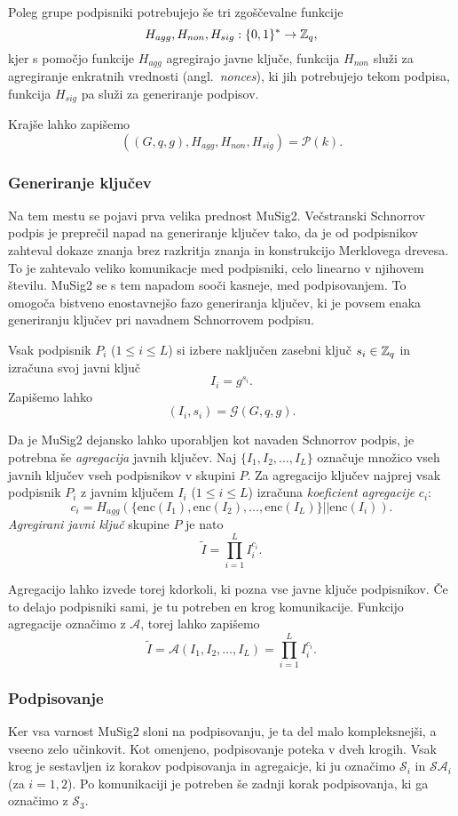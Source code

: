Poleg grupe podpisniki potrebujejo še tri zgoščevalne funkcije
$$
H_{agg}, H_{non}, H_{sig}:\{0, 1\}^* \rightarrow \mathbb Z_q,
$$
kjer s pomočjo funkcije $H_{agg}$ agregirajo javne ključe, funkcija $H_{non}$ služi za agregiranje
enkratnih vrednosti (angl.\ \textit{nonces}), ki jih potrebujejo tekom podpisa, funkcija $H_{sig}$
pa služi za generiranje podpisov.

Krajše lahko zapišemo
$$
((G, q, g), H_{agg}, H_{non}, H_{sig}) = \mathcal{P}(k).
$$

\subsubsection{Generiranje ključev}
Na tem mestu se pojavi prva velika prednost MuSig2. Večstranski Schnorrov podpis je preprečil napad
na generiranje ključev tako, da je od podpisnikov zahteval dokaze znanja brez razkritja znanja in
konstrukcijo Merklovega drevesa. To je zahtevalo veliko komunikacje med podpisniki, celo linearno
v njihovem številu. MuSig2 se s tem napadom sooči kasneje, med podpisovanjem. To omogoča bistveno
enostavnejšo fazo generiranja ključev, ki je povsem enaka generiranju ključev pri navadnem
Schnorrovem podpisu.

Vsak podpisnik $P_i$ ($1 \le i \le L$) si izbere naključen zasebni ključ $s_i \in \mathbb Z_q$ in izračuna
svoj javni ključ
$$
I_i = g^{s_i}.
$$
Zapišemo lahko
$$
(I_i, s_i) = \mathcal{G}(G, q, g).
$$

Da je MuSig2 dejansko lahko uporabljen kot navaden Schnorrov podpis, je potrebna še \textit{agregacija}
javnih ključev. Naj $\{I_1, I_2, \dots, I_L\}$ označuje množico vseh javnih ključev vseh podpisnikov v
skupini $P$. Za agregacijo ključev najprej vsak podpisnik $P_i$ z javnim ključem $I_i$ ($1 \le i \le L$)
izračuna \textit{koeficient agregacije} $c_i$:
$$
c_i = H_{agg}(\{\text{enc}(I_1), \text{enc}(I_2), \dots, \text{enc}(I_L)\} || \text{enc}(I_i)).
$$
\textit{Agregirani javni ključ} skupine $P$ je nato
$$
\tilde{I} = \prod_{i=1}^L I_i^{c_i}.
$$

Agregacijo lahko izvede torej kdorkoli, ki pozna vse javne ključe podpisnikov. Če to delajo podpisniki
sami, je tu potreben en krog komunikacije. Funkcijo agregacije označimo z $\mathcal{A}$, torej
lahko zapišemo
$$
\tilde{I} = \mathcal{A}(I_1, I_2, \dots, I_L) = \prod_{i=1}^L I_i^{c_i}.
$$

\subsubsection{Podpisovanje}
Ker vsa varnost MuSig2 sloni na podpisovanju, je ta del malo kompleksnejši, a vseeno zelo učinkovit.
Kot omenjeno, podpisovanje poteka v dveh krogih. Vsak krog je sestavljen iz korakov podpisovanja
in agregaicje, ki ju označimo $\mathcal{S}_i$ in $\mathcal{S}\mathcal{A}_i$ (za $i = 1, 2$). Po
komunikaciji je potreben še zadnji korak podpisovanja, ki ga označimo z $\mathcal{S}_3$.


